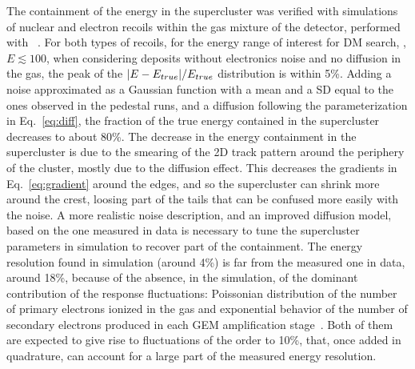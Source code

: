 The containment of the energy in the supercluster was verified
with simulations of nuclear and electron recoils  within
the gas mixture of the \lemon detector, performed with
\SRIM~\cite{bib:srim}.  For both types of recoils,
for the energy range of interest for DM search, \ie, $E \lesssim
100$\keV, when considering deposits without electronics noise and no
diffusion in the gas, the peak of the $\vert E-E_{true} \vert/E_{true}$
distribution is within 5\%. Adding a noise approximated as a Gaussian
function with a mean and a SD equal to the ones observed in the
pedestal runs, and a diffusion following the parameterization in
Eq.~\ref{eq:diff}, the fraction of the true energy contained in the
supercluster decreases to about 80\%.
%
The decrease in the energy containment in the supercluster is due to
the smearing of the 2D track pattern around the periphery of the
cluster, mostly due to the diffusion effect.  This decreases the
gradients in Eq.~\ref{eq:gradient} around the edges, and so the
supercluster can shrink more around the crest, loosing part of the
tails that can be confused more easily with the noise.  A more
realistic noise description, and an improved diffusion model, based on
the one measured in data is necessary to tune the supercluster
parameters in simulation to recover part of the containment.
The energy resolution found in simulation (around 4\%) is far from the
measured one in data, around 18\%, because of the absence, in the
simulation, of the dominant contribution of the response fluctuations:
Poissonian distribution of the number of primary electrons ionized in
the gas and exponential behavior of the number of secondary electrons
produced in each GEM amplification stage~\cite{bib:thesis}. Both of
them are expected to give rise to fluctuations of the order to 10\%,
that, once added in quadrature, can account for a large part of the
measured energy resolution.

%
%

